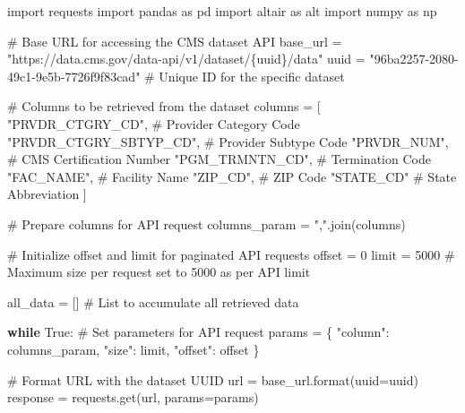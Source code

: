 \documentclass[
  letterpaper,
  DIV=11,
  numbers=noendperiod]{scrartcl}
\newenvironment{Shaded}{\begin{snugshade}}{\end{snugshade}}
\newcommand{\BuiltInTok}[1]{\textcolor[rgb]{0.00,0.23,0.31}{#1}}
\newcommand{\CommentTok}[1]{\textcolor[rgb]{0.37,0.37,0.37}{#1}}
\newcommand{\ControlFlowTok}[1]{\textcolor[rgb]{0.00,0.23,0.31}{\textbf{#1}}}
\newcommand{\DecValTok}[1]{\textcolor[rgb]{0.68,0.00,0.00}{#1}}
\newcommand{\ImportTok}[1]{\textcolor[rgb]{0.00,0.46,0.62}{#1}}
\newcommand{\NormalTok}[1]{\textcolor[rgb]{0.00,0.23,0.31}{#1}}
\newcommand{\OperatorTok}[1]{\textcolor[rgb]{0.37,0.37,0.37}{#1}}
\newcommand{\SpecialCharTok}[1]{\textcolor[rgb]{0.37,0.37,0.37}{#1}}
\newcommand{\StringTok}[1]{\textcolor[rgb]{0.13,0.47,0.30}{#1}}
\newcommand{\VariableTok}[1]{\textcolor[rgb]{0.07,0.07,0.07}{#1}}
\begin{document}
\begin{Shaded}
\begin{Highlighting}[]
\ImportTok{import}\NormalTok{ requests}
\ImportTok{import}\NormalTok{ pandas }\ImportTok{as}\NormalTok{ pd}
\ImportTok{import}\NormalTok{ altair }\ImportTok{as}\NormalTok{ alt}
\ImportTok{import}\NormalTok{ numpy }\ImportTok{as}\NormalTok{ np}

\CommentTok{\# Base URL for accessing the CMS dataset API}
\NormalTok{base\_url }\OperatorTok{=} \StringTok{"https://data.cms.gov/data{-}api/v1/dataset/}\SpecialCharTok{\{uuid\}}\StringTok{/data"}
\NormalTok{uuid }\OperatorTok{=} \StringTok{"96ba2257{-}2080{-}49c1{-}9e5b{-}7726f9f83cad"}  \CommentTok{\# Unique ID for the specific dataset}

\CommentTok{\# Columns to be retrieved from the dataset}
\NormalTok{columns }\OperatorTok{=}\NormalTok{ [}
    \StringTok{"PRVDR\_CTGRY\_CD"}\NormalTok{,        }\CommentTok{\# Provider Category Code}
    \StringTok{"PRVDR\_CTGRY\_SBTYP\_CD"}\NormalTok{,  }\CommentTok{\# Provider Subtype Code}
    \StringTok{"PRVDR\_NUM"}\NormalTok{,             }\CommentTok{\# CMS Certification Number}
    \StringTok{"PGM\_TRMNTN\_CD"}\NormalTok{,         }\CommentTok{\# Termination Code}
    \StringTok{"FAC\_NAME"}\NormalTok{,              }\CommentTok{\# Facility Name}
    \StringTok{"ZIP\_CD"}\NormalTok{,                }\CommentTok{\# ZIP Code}
    \StringTok{"STATE\_CD"}               \CommentTok{\# State Abbreviation}
\NormalTok{]}

\CommentTok{\# Prepare columns for API request}
\NormalTok{columns\_param }\OperatorTok{=} \StringTok{","}\NormalTok{.join(columns)}

\CommentTok{\# Initialize offset and limit for paginated API requests}
\NormalTok{offset }\OperatorTok{=} \DecValTok{0}
\NormalTok{limit }\OperatorTok{=} \DecValTok{5000}  \CommentTok{\# Maximum size per request set to 5000 as per API limit}

\NormalTok{all\_data }\OperatorTok{=}\NormalTok{ []  }\CommentTok{\# List to accumulate all retrieved data}

\ControlFlowTok{while} \VariableTok{True}\NormalTok{:}
    \CommentTok{\# Set parameters for API request}
\NormalTok{    params }\OperatorTok{=}\NormalTok{ \{}
        \StringTok{"column"}\NormalTok{: columns\_param,}
        \StringTok{"size"}\NormalTok{: limit,}
        \StringTok{"offset"}\NormalTok{: offset}
\NormalTok{    \}}

    \CommentTok{\# Format URL with the dataset UUID}
\NormalTok{    url }\OperatorTok{=}\NormalTok{ base\_url.}\BuiltInTok{format}\NormalTok{(uuid}\OperatorTok{=}\NormalTok{uuid)}
\NormalTok{    response }\OperatorTok{=}\NormalTok{ requests.get(url, params}\OperatorTok{=}\NormalTok{params)}


\end{Highlighting}
\end{Shaded}
\end{document}
